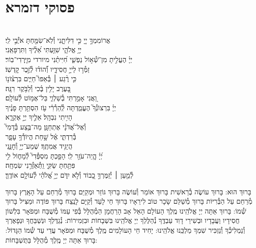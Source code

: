 \documentclass[twoside, openany, parskip=half, 11pt]{book}
\begin{document}
\section[פסוקי דזמרא]{ פסוקי דזמרא }
  \\
אֲרוֹמִמְךָ֣ יְיָ֭ כִּ֣י דִלִּיתָ֑נִי \hfill וְ֯לֹֽא־שִׂמַּ֖חְתָּ אֹיְ֯בַ֣י לִֽי׃\\
יְיָ֥ אֱלֹהָ֑י \hfill שִׁוַּ֥עְתִּי אֵ֝לֶ֗יךָ וַתִּרְפָּאֵֽנִי׃\\
יְיָ֗ הֶעֱלִ֣יתָ מִן־שְׁ֯א֣וֹל נַפְשִׁ֑י \hfill חִ֝יִּיתַ֗נִי מיורדי מִיׇּֽרְדִי־בֽוֹר׃\\
זַמְּ֯ר֣וּ לַייָ֣ חֲסִידָ֑יו \hfill וְ֯֝הוֹד֗וּ לְ֯זֵ֣כֶר קׇדְשֽׁוֹ׃\\
כִּ֤י רֶ֨גַע ׀ בְּ֯אַפּוֹ֮ \hfill חַיִּ֢ים בִּרְצ֫וֹנ֥וֹ\\
בָּ֭עֶרֶב יָלִ֥ין בֶּ֗כִי \hfill וְ֯לַבֹּ֥קֶר רִנָּֽה׃\\
וַ֭אֲנִי אָמַ֣רְתִּי בְ֯שַׁלְוִ֑י \hfill בַּל־אֶמּ֥וֹט לְ֯עוֹלָֽם׃\\
יְיָ֗ בִּרְצוֹנְ֯ךָ֮ הֶעֱמַ֢דְתָּה לְֽ֯הַרְ֯רִ֫י עֹ֥ז \hfill הִסְתַּ֥רְתָּ פָנֶ֗יךָ\\
הָיִ֥יתִי נִבְהָֽל׃ \hfill אֵלֶ֣יךָ יְיָ֣ אֶקְרָ֑א \\
וְ֯אֶל־אֲ֝דֹנָ֗י אֶתְחַנָּֽן׃ \hfill מַה־בֶּ֥צַע בְּ֯דָמִי֮\\
בְּ֯רִדְתִּ֢י אֶ֫ל שָׁ֥חַת \hfill הֲיוֹדְ֯ךָ֥ עָפָ֑ר\\
הֲיַגִּ֥יד אֲמִתֶּֽךָ׃ \hfill שְׁמַע־יְיָ֥ וְ֯חׇנֵּ֑נִי\\
יְ֝יָ֗ הֱֽיֵה־עֹזֵ֥ר לִֽי׃ \hfill הָפַ֣כְתָּ מִסְפְּ֯דִי֮ לְ֯מָח֢וֹל לִ֥י\\
פִּתַּ֥חְתָּ שַׂקִּ֑י \hfill וַֽתְּ֯אַזְּ֯רֵ֥נִי שִׂמְחָֽה׃\\
לְ֯מַ֤עַן ׀ יְ֯זַמֶּרְךָ֣ כָ֭בוֹד וְ֯לֹ֣א יִדֹּ֑ם \hfill יְיָ֥ אֱ֝לֹהַ֗י לְ֯עוֹלָ֥ם אוֹדֶֽךָּ׃ \\
\mournerskaddish


בָּרוּךְ הוּא:
בָּרוּךְ עוֹשֶׂה בְ֯רֵאשִׁית בָּרוּךְ אוֹמֵר וְ֯עוֹשֶׂה
בָּרוּךְ גּוֹזֵר וּמְקַיֵּם בָּרוּךְ מְ֯רַחֵם עַל הָאָֽרֶץ
בָּרוּךְ מְ֯רַחֵם עַל הַבְּ֯רִיּוֹת בָּרוּךְ מְ֯שַׁלֵּם שָׂכָר טוֹב לִירֵאָיו
בָּרוּךְ חַי לָעַד וְ֯קַיָּם לָנֶֽצַח בָּרוּךְ פּוֹדֶה וּמַצִּיל בָּרוּךְ שְׁ֯מוֹ:
בָּרוּךְ אַתָּה יְיָ אֱלֹהֵֽינוּ מֶֽלֶךְ הָעוֹלָם הָאֵל אָב הָרַחֲמָן הַמְ֯הֻלָּל בְּ֯פִי עַמּוֹ מְ֯שֻׁבָּח וּמְפֹאָר בִּלְשׁוֹן חֲסִידָיו וַעֲבָדָיו וּבְשִׁירֵי דָוִד עַבְדֶּֽךָ נְ֯הַלֶּלְךָ יְיָ אֱלֹהֵֽינוּ בִּשְׁבָחוֹת וּבִזְמִירוֹת: נְ֯גַדֶּלְךָ וּנְשַׁבֵּחֲךָ וּנְפָאֶרְךָ וְ֯נַמְלִיכְ֯ךָ וְ֯נַזְכִּיר שִׁמְךָ מַלְכֵּֽנוּ אֱלֹהֵֽינוּ:
 יָחִיד חֵי הָעוֹלָמִים מֶֽלֶךְ מְ֯שֻׁבָּח וּמְפֹאָר עֲדֵי עַד שְׁ֯מוֹ הַגָּדוֹל: בָּרוּךְ אַתָּה יְיָ מֶֽלֶךְ מְ֯הֻלָּל בַּתֻּשְׁבָּחוֹת:
\end{document}
